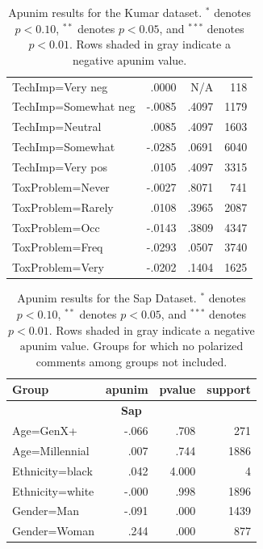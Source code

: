 \documentclass{article} %
\theoremstyle{definition}
\theoremstyle{plain}
\begin{document}
\begin{table}[t]
\begin{tabularx}{\columnwidth}{X r r r}
		TechImp=Very neg & .0000 & N/A & 118 \\
		\rowcolor{gray!15}
		TechImp=Somewhat neg & -.0085 & .4097 & 1179 \\
		TechImp=Neutral & .0085 & .4097 & 1603 \\
		\rowcolor{gray!15}
		TechImp=Somewhat & -.0285 & .0691 & 6040 \\
		TechImp=Very pos& .0105 & .4097 & 3315 \\
		\rowcolor{gray!15}
		ToxProblem=Never & -.0027 & .8071 & 741 \\
		ToxProblem=Rarely & .0108 & .3965 & 2087 \\
		\rowcolor{gray!15}
		ToxProblem=Occ & -.0143 & .3809 & 4347 \\
		\rowcolor{gray!15}
		ToxProblem=Freq & -.0293 & .0507 & 3740 \\
		\rowcolor{gray!15}
		ToxProblem=Very & -.0202 & .1404 & 1625 \\
		
		\bottomrule
	\end{tabularx}
	\caption{Apunim results for the Kumar dataset. $^{*}$ denotes $p<0.10$, $^{**}$ denotes $p<0.05$, and $^{***}$ denotes $p<0.01$. Rows shaded in gray indicate a negative $\text{apunim}$ value.}
	\label{tab:sdb-features}
\end{table}

\begin{table}[t]
	\small
	\centering
	
	\begin{tabularx}{\columnwidth}{X r r r}
		\toprule
		\textbf{Group} & \textbf{apunim} & \textbf{pvalue} & \textbf{support} \\
		\midrule
		
		\multicolumn{4}{c}{\textbf{Sap}} \\
		\midrule
		\rowcolor{gray!15}
		Age=GenX+ & -.066 & .708 & 271 \\
		Age=Millennial & .007 & .744 & 1886 \\
		Ethnicity=black & .042 & 4.000 & 4 \\
		\rowcolor{gray!15}
		Ethnicity=white & -.000 & .998 & 1896 \\
		\rowcolor{gray!15}
		Gender=Man & -.091 & .000 & 1439 \\
		Gender=Woman & .244 & .000 & 877 \\
		
		\bottomrule
	\end{tabularx}
	\caption{Apunim results for the Sap Dataset. $^{*}$ denotes $p<0.10$, $^{**}$ denotes $p<0.05$, and $^{***}$ denotes $p<0.01$.  Rows shaded in gray indicate a negative $\text{apunim}$ value. Groups for which no polarized comments among groups not included.}
	\label{tab:sap-full}
\end{table}
\end{document}
